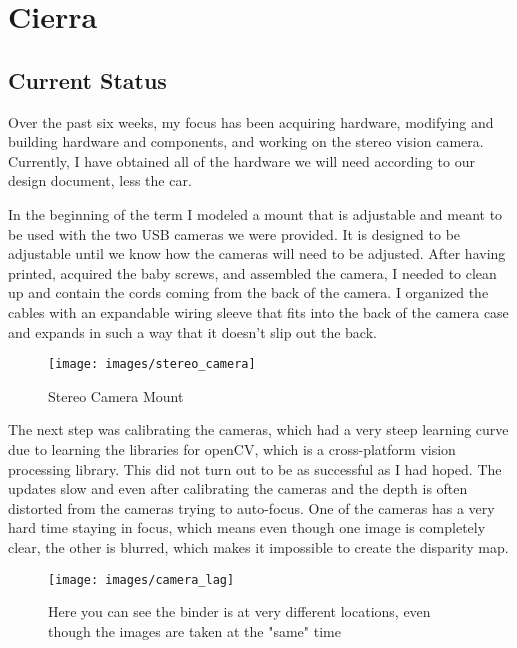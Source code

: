 \documentclass[compsoc,draftclsnofoot,onecolumn,10pt]{IEEEtran}
\begin{document}
\section{Cierra}
	\subsection{Current Status}
		Over the past six weeks, my focus has been acquiring hardware, modifying and building hardware and components, and working on the stereo vision camera. 
		Currently, I have obtained all of the hardware we will need according to our design document, less the car. 
		
		In the beginning of the term I modeled a mount that is adjustable and meant to be used with the two USB cameras we were provided. 
		It is designed to be adjustable until we know how the cameras will need to be adjusted. 
		After having printed, acquired the baby screws, and assembled the camera, I needed to clean up and contain the cords coming from the back of the camera. 
		I organized the cables with an expandable wiring sleeve that fits into the back of the camera case and expands in such a way that it doesn't slip out the back. 
		\begin{figure}[H]
 		\centering
		\texttt{[image: images/stereo\_camera]}
		\caption{Stereo Camera Mount}
		\end{figure}
		
		The next step was calibrating the cameras, which had a very steep learning curve due to learning the libraries for openCV, which is a cross-platform vision processing library. 
		This did not turn out to be as successful as I had hoped.
		The updates slow and even after calibrating the cameras and the depth is often distorted from the cameras trying to auto-focus. 
		One of the cameras has a very hard time staying in focus, which means even though one image is completely clear, the other is blurred, which makes it impossible to create the disparity map.
		
		\begin{figure}[H]
 		\centering
		\texttt{[image: images/camera\_lag]}
		\caption{Here you can see the binder is at very different locations, even though the images are taken at the "same" time}
		\end{figure}
		
\end{document}

